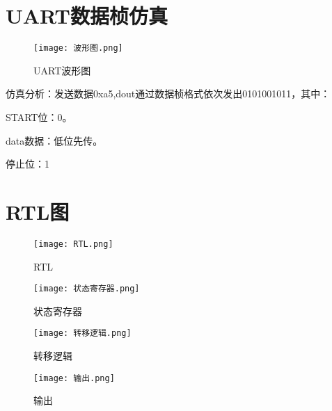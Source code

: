 \documentclass{article}
\begin{document}
\section{\textbf{UART数据桢仿真}}
\begin{figure}[htbp]%
    \centering %
    \texttt{[image: 波形图.png]} %
    \caption{UART波形图} %
\end{figure}

仿真分析：发送数据0xa5,dout通过数据桢格式依次发出0101001011，其中：\par
START位：0。\par
data数据：低位先传。\par
停止位：1\par

\section{\textbf{RTL图}}
\begin{figure}[htbp]%
    \centering %
    \texttt{[image: RTL.png]} %
    \caption{RTL} %
\end{figure}


\begin{figure}[htbp]%
    \centering %
    \texttt{[image: 状态寄存器.png]} %
    \caption{状态寄存器} %
\end{figure}



\begin{figure}[htbp]%
    \centering %
    \texttt{[image: 转移逻辑.png]} %
    \caption{转移逻辑} %
\end{figure}


\begin{figure}[htbp]%
    \centering %
    \texttt{[image: 输出.png]} %
    \caption{输出} %
\end{figure}
\end{document}
